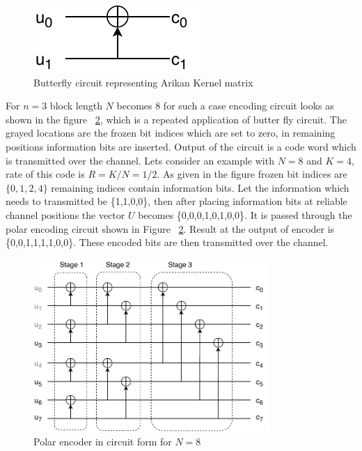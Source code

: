 \begin{figure}[h]
	\centering
	\includegraphics{./figures/ButterFlyCircuit.pdf}
	\caption{Butterfly circuit representing Arikan Kernel matrix}
	\label{fig:butterFlyCicuit}
\end{figure}

For $n = 3$ block length $N$ becomes 8 for such a case encoding circuit looks as shown in the figure ~\ref{fig:encoderCircuit}, which is a repeated application of butter fly circuit. The grayed locations are the frozen bit indices which are set to zero, in remaining positions information bits are inserted. Output of the circuit is a code word which is transmitted over the channel. Lets consider an example with $N = 8$ and $K = 4$, rate of this code is $R = K/N = 1/2$. As given in the figure frozen bit indices are ${\{0,1,2,4\}}$ remaining indices contain information bits.  Let the information which needs to transmitted be \{1,1,0,0\}, then after placing information bits at reliable channel positions the vector $U$ becomes \{0,0,0,1,0,1,0,0\}. It is passed through the polar encoding circuit shown in Figure ~\ref{fig:encoderCircuit}. Result at the output of encoder is \{0,0,1,1,1,1,0,0\}. These encoded bits are then transmitted over the channel.

\begin{figure}[h]
	\centering
	\includegraphics[width=0.8\textwidth]{./figures/EncodingCircuitStages.pdf}
	\caption{Polar encoder in circuit form for $N = 8$}
	\label{fig:encoderCircuit}
\end{figure}


